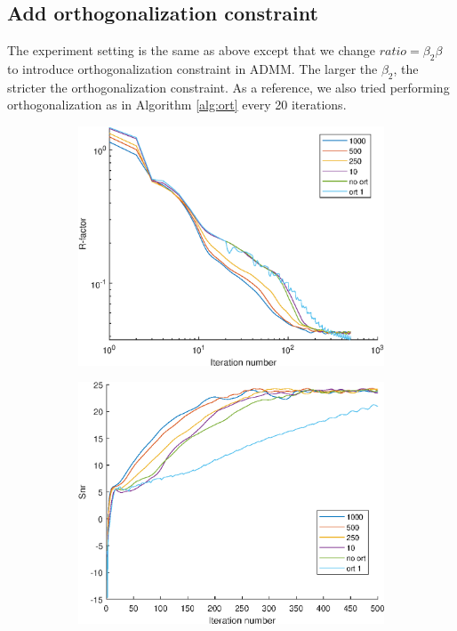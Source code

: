 \documentclass{article}
\numberwithin{equation}{section}
\begin{document}
\subsection{Add orthogonalization constraint}
The experiment setting is the same as above except that we change $ratio=\beta_2\beta$ to introduce orthogonalization constraint in ADMM. The larger the $\beta_2$, the stricter the orthogonalization constraint. As a reference, we also tried performing orthogonalization as in Algorithm \ref{alg:ort} every 20 iterations. 
\begin{figure}
 \begin{subfigure}{.33\textwidth}
   \centering
   \includegraphics[width=1\linewidth]{../figures/ort_R.eps}  
   \label{fig:ort_R}
 \end{subfigure}
 \begin{subfigure}{.3\textwidth}
   \centering
   \includegraphics[width=1\linewidth]{../figures/ort_snr.eps}  

\end{subfigure}
\end{figure}
\end{document}
